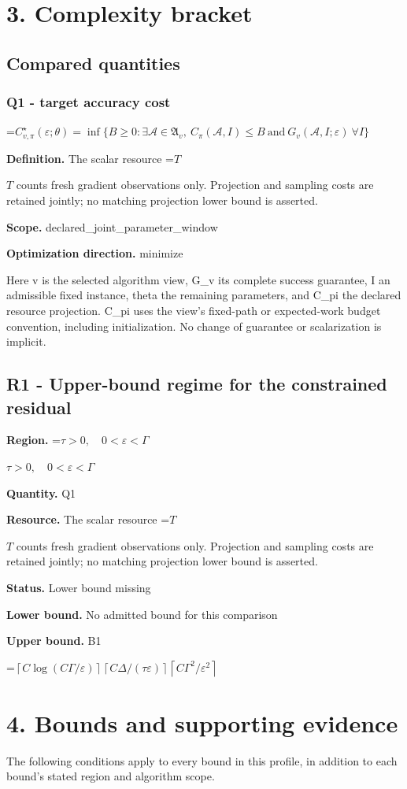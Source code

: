 \documentclass[10pt,a4paper]{article}
\newcommand{\AtlasMath}[1]{\par\begingroup\centering\setbox0=\hbox{$\displaystyle #1$}\ifdim\wd0>1.4\linewidth\typeout{ATLAS WIDE FORMULA: \the\wd0}\fi\ifdim\wd0>\linewidth\resizebox{\linewidth}{!}{\box0}\else\box0\fi\par\endgroup}
\newcommand{\AtlasInlineMath}[1]{\begingroup\setbox0=\hbox{$#1$}\ifdim\wd0>.4\linewidth\endgroup\AtlasMath{#1}\else\endgroup$#1$\fi}
\begin{document}
\section{3. Complexity bracket}
\subsection{Compared quantities}
\subsubsection{Q1 - target accuracy cost}
\AtlasMath{C^\star_{v,\pi}(\varepsilon;\theta)=\inf\{B\ge0:\exists\mathcal A\in\mathfrak A_v,\ C_\pi(\mathcal A,I)\le B\ \text{and}\ G_v(\mathcal A,I;\varepsilon)\ \forall I\}}
\textbf{Definition.} The scalar resource \AtlasInlineMath{T} counts fresh gradient observations only. Projection and sampling costs are retained jointly; no matching projection lower bound is asserted.

\textbf{Scope.} declared\_joint\_parameter\_window

\textbf{Optimization direction.} minimize

Here v is the selected algorithm view, G\_v its complete success guarantee, I an admissible fixed instance, theta the remaining parameters, and C\_pi the declared resource projection. C\_pi uses the view's fixed-path or expected-work budget convention, including initialization. No change of guarantee or scalarization is implicit.

\subsection{R1 - Upper-bound regime for the constrained residual}
\textbf{Region.} \AtlasInlineMath{\tau>0,\quad0<\varepsilon<\Gamma}

\textbf{Quantity.} Q1

\textbf{Resource.} The scalar resource \AtlasInlineMath{T} counts fresh gradient observations only. Projection and sampling costs are retained jointly; no matching projection lower bound is asserted.

\textbf{Status.} Lower bound missing

\textbf{Lower bound.} No admitted bound for this comparison

\textbf{Upper bound.} B1

\AtlasMath{\left\lceil C\log(C\Gamma/\varepsilon)\right\rceil\left\lceil C\Delta/(\tau\varepsilon)\right\rceil\left\lceil C\Gamma^2/\varepsilon^2\right\rceil}
\section{4. Bounds and supporting evidence}
The following conditions apply to every bound in this profile, in addition to each bound's stated region and algorithm scope.
\end{document}
